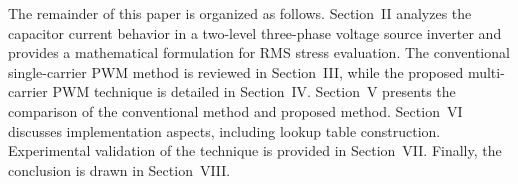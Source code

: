 \documentclass{IPEC2026}
\begin{document}


The remainder of this paper is organized as follows.
Section~II analyzes the capacitor current behavior in a two-level three-phase voltage source inverter and provides a mathematical formulation for RMS stress evaluation. 
The conventional single-carrier PWM method is reviewed in Section~III, while the proposed multi-carrier PWM technique is detailed in Section~IV. 
Section~V presents the comparison of the conventional method and proposed method. 
Section~VI discusses implementation aspects, including lookup table construction. Experimental validation of the technique is provided in Section~VII. 
Finally, the conclusion is drawn in Section~VIII.
\end{document}
